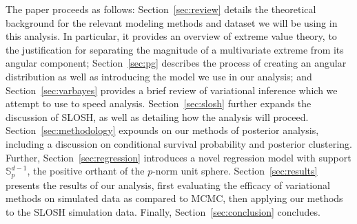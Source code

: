 
The paper proceeds as follows:  Section~\ref{sec:review} details the theoretical background 
    for the relevant modeling methods and dataset we will be using in this analysis.  
    In particular, it provides an overview of extreme value theory, to the justification 
    for separating the magnitude of a multivariate extreme from its angular component; 
    Section~\ref{sec:pg} describes the process of creating an angular distribution as 
    well as introducing the model we use in 
    our analysis; and Section~\ref{sec:varbayes} provides a brief review of variational
    inference which we attempt to use to speed analysis.  Section~\ref{sec:slosh} further
    expands the discussion of SLOSH, as well as detailing how the analysis will proceed.
    Section~\ref{sec:methodology} expounds on our methods of posterior analysis, including
    a discussion on conditional survival probability and posterior clustering. Further,
    Section~\ref{sec:regression} introduces a novel regression model with support
    $\mathbb{S}_{p}^{d-1}$, the positive orthant of the $p$-norm unit sphere.
    Section~\ref{sec:results} presents the results of our analysis, first evaluating 
    the efficacy of variational methods on simulated data as compared to MCMC, 
    then applying our methods to the SLOSH simulation data.  Finally, 
    Section~\ref{sec:conclusion} concludes.

